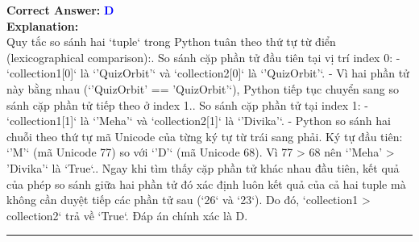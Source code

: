 \documentclass[11pt,a4paper]{article}
\begin{document}
\begin{minipage}{\textwidth}
\noindent \textbf{Correct Answer:} \textcolor{blue}{\textbf{D}} \\[4pt]
\noindent \textbf{Explanation:}\\
Quy tắc so sánh hai `tuple` trong Python tuân theo thứ tự từ điển (lexicographical comparison):. So sánh cặp phần tử đầu tiên tại vị trí index 0:\newline
   - `collection1[0]` là `'QuizOrbit'` và `collection2[0]` là `'QuizOrbit'`.\newline
   - Vì hai phần tử này bằng nhau (`'QuizOrbit' == 'QuizOrbit'`), Python tiếp tục chuyển sang so sánh cặp phần tử tiếp theo ở index 1.. So sánh cặp phần tử tại index 1:\newline
   - `collection1[1]` là `'Meha'` và `collection2[1]` là `'Divika'`.\newline
   - Python so sánh hai chuỗi theo thứ tự mã Unicode của từng ký tự từ trái sang phải. Ký tự đầu tiên: `'M'` (mã Unicode 77) so với `'D'` (mã Unicode 68). Vì 77 > 68 nên `'Meha' > 'Divika'` là `True`.. Ngay khi tìm thấy cặp phần tử khác nhau đầu tiên, kết quả của phép so sánh giữa hai phần tử đó xác định luôn kết quả của cả hai tuple mà không cần duyệt tiếp các phần tử sau (`26` và `23`).\newline
Do đó, `collection1 > collection2` trả về `True`. Đáp án chính xác là D.
\end{minipage}
\vspace{0.8cm}
\hrule
\vspace{0.5cm}
\end{document}
